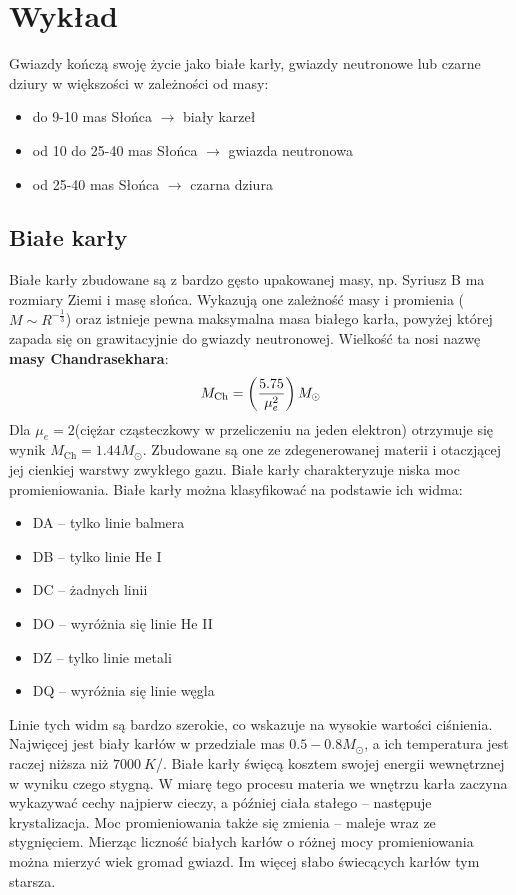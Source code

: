 \documentclass[../index.tex]{subfiles}
\begin{document}
    \section{Wykład}
        Gwiazdy kończą swoję życie jako białe karły, gwiazdy neutronowe lub czarne dziury w większości w zależności od masy:
        \begin{itemize}
            \item do 9-10 mas Słońca \( \to \) biały karzeł
            \item od 10 do 25-40 mas Słońca \(\to \) gwiazda neutronowa
            \item od 25-40 mas Słońca \(\to \) czarna dziura
        \end{itemize}
        \subsection{Białe karły}
            Białe karły zbudowane są z bardzo gęsto upakowanej masy, np. Syriusz B ma rozmiary Ziemi i masę słońca. Wykazują one zależność masy i promienia (\(M\sim R^{ - \frac{1}{3}}\)) oraz istnieje pewna maksymalna masa białego karła, powyżej której zapada się on grawitacyjnie do gwiazdy neutronowej. Wielkość ta nosi nazwę \textbf{masy Chandrasekhara}:
            \begin{equation}
                M_\text{Ch} =\left(\frac{5.75}{\mu_e^2}\right)M_\odot
            \end{equation}
            Dla \(\mu_e = 2\)(ciężar cząsteczkowy w przeliczeniu na jeden elektron) otrzymuje się wynik \(M_\text{Ch} = 1.44M_\odot\). Zbudowane są one ze zdegenerowanej materii i otaczjącej jej cienkiej warstwy zwykłego gazu. Białe karły charakteryzuje niska moc promieniowania. Białe karły można klasyfikować na podstawie ich widma:
            \begin{itemize}
                \item DA – tylko linie balmera
                \item DB – tylko linie He I
                \item DC – żadnych linii
                \item DO – wyróżnia się linie He II
                \item DZ – tylko linie metali
                \item DQ – wyróżnia się linie węgla
            \end{itemize}
            Linie tych widm są bardzo szerokie, co wskazuje na wysokie wartości ciśnienia. Najwięcej jest biały karłów w przedziale mas \(0.5 - 0.8 M_\odot\), a ich temperatura jest raczej niższa niż \(7000\:K\)/. Białe karły święcą kosztem swojej energii wewnętrznej w wyniku czego stygną. W miarę tego procesu materia we wnętrzu karła zaczyna wykazywać cechy najpierw cieczy, a później ciała stałego – następuje krystalizacja. Moc promieniowania także się zmienia – maleje wraz ze stygnięciem. Mierząc liczność białych karłów o różnej mocy promieniowania  można mierzyć wiek gromad gwiazd. Im więcej słabo świecących karłów tym starsza.
\end{document}
